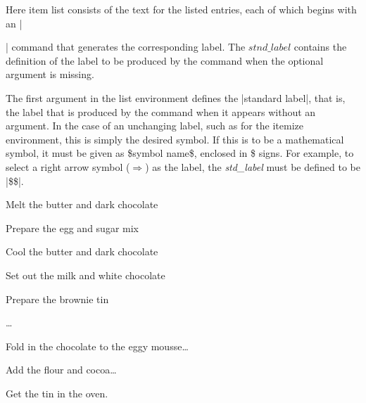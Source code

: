 Here item list consists of the text for the listed entries, each of which
begins with an |\item| command that generates the corresponding label.
The \(stnd\_label\) contains the definition of the label to be produced by the
 command when the optional argument is missing.  

The first argument in the list environment defines the |standard label|, that
is, the label that is produced by the  command when it appears
without an argument. In the case of an unchanging label, such as for the
itemize environment, this is simply the desired symbol. If this is to be a
mathematical symbol, it must be given as \$symbol name\$, enclosed in \$
signs. For example, to select a right arrow symbol ($\Rightarrow$) as the label, 
the \emph{std\_label} must be defined to be |\$\Rightarrow\$|.



\setcounter{steps}{0}

\begin{list}{\bfseries\upshape Step :}
{%
\setlength{\labelwidth}{2cm}\setlength{\leftmargin}{2.6cm}
\setlength{\labelsep}{0.5cm}\setlength{\rightmargin}{1cm}
\setlength{\parsep}{0.5ex plus0.2ex minus0.1ex}
\setlength{\itemsep}{0ex plus0.2ex minus0pt}\relax \slshape %
}
\item Melt the butter and dark chocolate
\item Prepare the egg and sugar mix
\item Cool the butter and dark chocolate
\item Set out the milk and white chocolate
\item Prepare the brownie tin

\item[]\ldots
    
\item Fold in the chocolate to the eggy mousse\ldots
\item Add the flour and cocoa\ldots
\item Get the tin in the oven.
\end{list}



